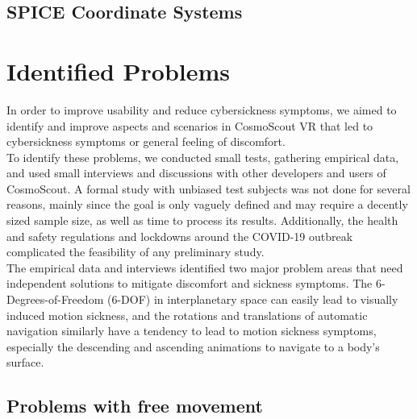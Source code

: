 \subsection{SPICE Coordinate Systems}\label{subsec:spice-coordinate-systems}


\section{Identified Problems}\label{sec:identified-problems}

In order to improve usability and reduce cybersickness symptoms, we aimed to identify and improve aspects and
scenarios in CosmoScout VR that led to cybersickness symptoms or general feeling of discomfort.
\\
To identify these problems, we conducted small tests, gathering empirical data, and used small interviews and
discussions with other developers and users of CosmoScout.
A formal study with unbiased test subjects was not done for several reasons, mainly since the goal is only vaguely
defined and may require a decently sized sample size, as well as time to process its results.
Additionally, the health and safety regulations and lockdowns around the COVID-19 outbreak complicated the feasibility
of any preliminary study.
\\
The empirical data and interviews identified two major problem areas that need independent solutions to mitigate
discomfort and sickness symptoms.
The 6-Degrees-of-Freedom (6-DOF) in interplanetary space can easily lead to visually induced motion sickness, and the
rotations and translations of automatic navigation similarly have a tendency to lead to motion sickness symptoms,
especially the descending and ascending animations to navigate to a body's surface.


\subsection{Problems with free movement}\label{subsec:problems-with-free-movement}

